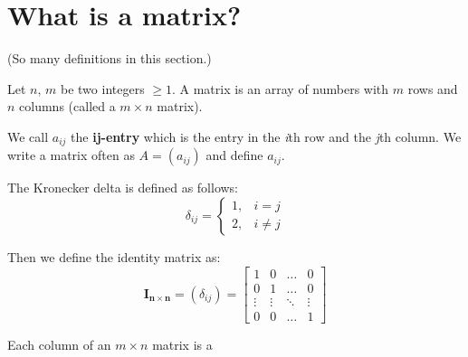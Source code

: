 \documentclass[../main.tex]{subfiles}
\begin{document}
\section{What is a matrix?}

(So many definitions in this section.)

\begin{definition}[Matrix]
    Let \( n,\, m \) be two integers \( \geq 1 \).
    A matrix is an array of numbers with \( m \) rows and \( n \) columns (called a \( m \times n \) matrix).
\end{definition}

We call \textbf{\( a_{ij} \)} the \textbf{ij-entry} which is the entry in the \textit{i}th row and the \textit{j}th column.
We write a matrix often as \( A=(a_{ij}) \) and define \( a_{ij} \).

\begin{definition}
    The Kronecker delta is defined as follows:
    \[
        \delta_{ij} =
        \begin{cases}
            1,& i = j \\
            2,& i \neq j
        \end{cases}
    \]

    Then we define the identity matrix as:
    \[ \mathbf{I_{n \times n}} = (\delta_{ij}) =
        \begin{bmatrix}
            1 & 0 &  \dots  & 0 \\
            0 & 1 & \dots & 0 \\
            \vdots & \vdots & \ddots & \vdots \\
            0 & 0 & \dots  & 1
        \end{bmatrix}
    \]
\end{definition}

\begin{definition}
    Each column of an \( m \times n \) matrix is a 
\end{definition}
\end{document}
